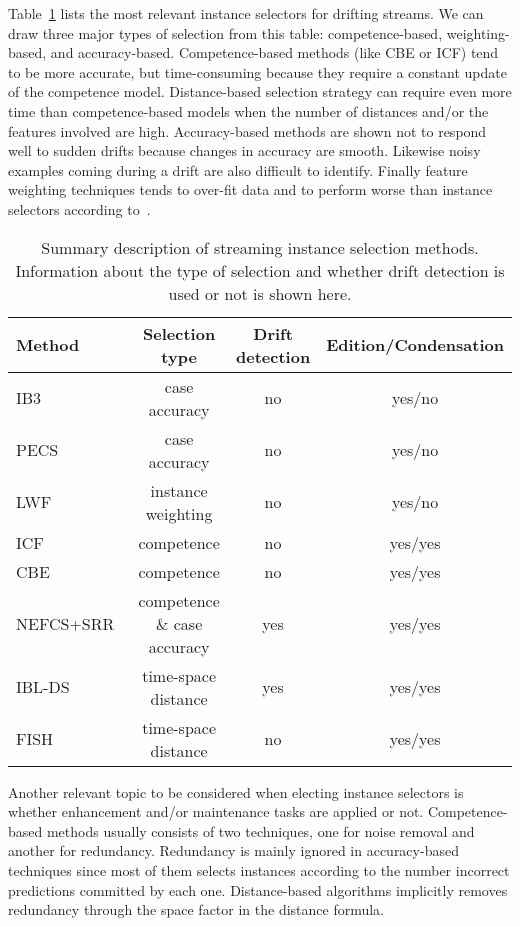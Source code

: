 \documentclass[preprint,12pt]{elsarticle}
\begin{document}
Table~\ref{tab:instance} lists the most relevant instance selectors for drifting streams. We can draw three major types of selection from this table: competence-based, weighting-based, and accuracy-based. Competence-based methods (like CBE or ICF) tend to be more accurate, but time-consuming because they require a constant update of the competence model. Distance-based selection strategy can require even more time than competence-based models when the number of distances and/or the features involved are high. Accuracy-based methods are shown not to respond well to sudden drifts because changes in accuracy are smooth. Likewise noisy examples coming during a drift are also difficult to identify. Finally feature weighting techniques tends to over-fit data and to perform worse than instance selectors according to~\cite{klinken04}.

\begin{table}[!htp]
\renewcommand{\arraystretch}{1.3}
\centering
\scriptsize
\caption{Summary description of streaming instance selection methods. Information about the type of selection and whether drift detection is used or not is shown here.}
\label{tab:instance}
\begin{tabular}{ lccc }
\toprule
{\bf Method} & {\bf Selection type} & {\bf Drift detection} & {\bf Edition/Condensation} \\
\midrule
IB3~\cite{aha91} & case accuracy & no & yes/no\\
PECS~\cite{salga97} & case accuracy & no & yes/no\\
LWF~\cite{salga93} & instance weighting & no & yes/no\\
ICF~\cite{brighton02} & competence & no & yes/yes\\
CBE~\cite{delany05} & competence & no & yes/yes\\
NEFCS+SRR~\cite{lu16} & competence \& case accuracy & yes & yes/yes\\
IBL-DS~\cite{berin07} & time-space distance & yes & yes/yes\\
FISH~\cite{zlio11} & time-space distance & no & yes/yes\\
\bottomrule
\end{tabular}
\end{table}

Another relevant topic to be considered when electing instance selectors is whether enhancement and/or maintenance tasks are applied or not. Competence-based methods usually consists of two techniques, one for noise removal and another for redundancy. Redundancy is mainly ignored in accuracy-based techniques since most of them selects instances according to the number incorrect predictions committed by each one. Distance-based algorithms implicitly removes redundancy through the space factor in the distance formula.
\end{document}
